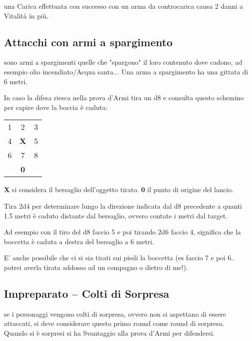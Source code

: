 \documentclass[12pt,a4paper,twoside,openany]{book}
\begin{document}
\begin{multicols}{2}
una Carica effettuata con successo con un arma da controcarica causa 2 danni a Vitalità in più.

\subsection{Attacchi con armi a spargimento} \label{attacchiarmidaspargimento}\hypertarget{spargimento}{}

sono armi a spargimenti quelle che "spargono" il loro contenuto dove cadono, ad esempio olio incendiato/Acqua santa... Una arma a spargimento ha una gittata di 6 metri.

In caso la difesa riesca nella prova d'Armi tira un d8 e consulta questo schemino per capire dove la boccia è caduta:

\medskip

\begin{tabularx}{0.30\textwidth}{ccc}
1& 2& 3\\
4 &\textbf{X}& 5\\
6 &7 &8\\
&\textbf{0}&\\
\end{tabularx}

\smallskip

\textbf{X} si considera il bersaglio dell'oggetto tirato. \textbf{0} il punto di origine del lancio.

Tira 2d4 per determinare lungo la direzione indicata dal d8 precedente a quanti 1.5 metri è caduto distante dal bersaglio, ovvero contate i metri dal target.

Ad esempio con il tiro del d8 faccio 5 e poi tirando 2d6 faccio 4, significa che la boccetta è caduta a destra del bersaglio a 6 metri.

E' anche possibile che ci si sia tirati sui piedi la boccetta (es faccio 7 e poi 6.. potrei averla tirata addosso ad un compagno o dietro di me!).


\subsection{Impreparato -- Colti di Sorpresa}\label{coltidisorpresa}

se i personaggi vengono colti di sorpresa, ovvero non si aspettano di essere attaccati, si deve considerare questo primo round come round di sorpresa. Quando si è sorpresi si ha Svantaggio alla prova d'Armi per difendersi.


\end{multicols}
\end{document}
